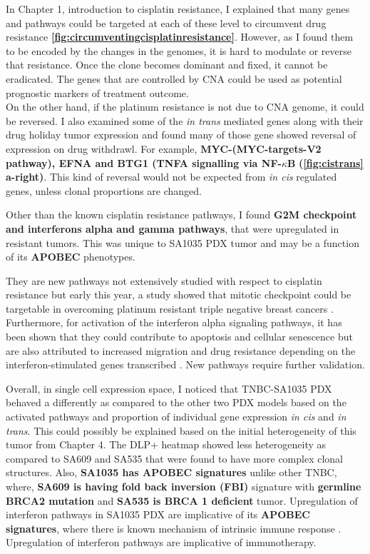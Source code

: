 In Chapter 1, introduction to cisplatin resistance, I explained that many genes and pathways could be targeted at each of these level to circumvent drug resistance  \textbf{\autoref{fig:circumventingcisplatinresistance}}. However, as I found them to be encoded by the changes in the genomes, it is hard to modulate or reverse that resistance. Once the clone becomes  dominant and fixed, it cannot be eradicated.
 The genes that are controlled by CNA could be used as potential prognostic markers of treatment outcome.
\\
On the other hand, if the platinum resistance is not due to CNA genome, it could be reversed. I also examined some of the \textit{in trans} mediated genes along with their drug holiday tumor expression and found many of those gene showed reversal of expression on drug withdrawl. For example, \textbf{MYC-(MYC-targets-V2 pathway), EFNA and BTG1 (TNFA signalling via NF-$\kappa$B} \textbf{(\autoref{fig:cistrans} a-right)}.
This kind of reversal would not be expected from \textit{in cis} regulated genes, unless clonal proportions are changed.  


Other than the known cisplatin resistance pathways, I found \textbf{G2M checkpoint and interferons alpha and gamma pathways}, that were upregulated in resistant tumors. This was unique to SA1035 PDX tumor and may be a function of its \textbf{APOBEC} phenotypes. 


They are new pathways not extensively studied with respect to cisplatin resistance but early this year, a study showed that mitotic checkpoint could be  targetable in overcoming platinum resistant triple negative breast cancers \cite{ moens2021mitotic}. Furthermore, for activation of the interferon alpha signaling pathways, it has been shown that they could contribute to apoptosis and cellular senescence but are also attributed to increased migration and drug resistance depending on the interferon-stimulated genes transcribed \cite{provance2019deciphering, mojic2018dark}. New pathways require further validation. 
 

Overall, in single cell expression space, I noticed that TNBC-SA1035 PDX behaved a differently as compared to the other two PDX models based on the activated pathways and proportion of individual gene expression \textit{in cis} and \textit{in trans}. This could possibly be explained based on the initial heterogeneity of this tumor from Chapter 4. The DLP+ heatmap showed less heterogeneity as compared to SA609 and SA535 that were found to have more complex clonal structures. Also, \textbf{SA1035 has APOBEC signatures} unlike other TNBC, where, \textbf{SA609 is having fold back inversion (FBI)} signature with \textbf{germline BRCA2 mutation} and \textbf{SA535 is BRCA 1 deficient} tumor. Upregulation of interferon pathways in SA1035 PDX are implicative of its \textbf{APOBEC signatures}, where there is known mechanism of intrinsic immune response \cite{wang2018apobec3b}. Upregulation of interferon pathways are implicative of immunotherapy.



